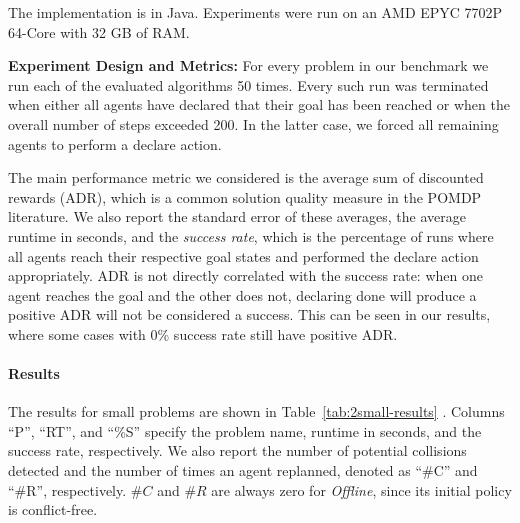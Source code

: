 \documentclass[letterpaper]{article} %
\begin{document}
The implementation is in Java. Experiments were run on an AMD\textsc{\textregistered} EPYC 7702P 64-Core with 32 GB of RAM.



\noindent\textbf{Experiment Design and Metrics:}
For every problem in our benchmark we run each of the evaluated algorithms 50 times. 
Every such run was terminated when either all agents have declared that their goal has been reached or when the overall number of steps exceeded 200. In the latter case, we forced all remaining agents to perform a declare action. 


The main performance metric we considered is the average sum of discounted rewards (ADR), which is a common solution quality measure in the POMDP literature. 
We also report the standard error of these averages, the average runtime in seconds, 
and the \emph{success rate}, which is the percentage of runs where all agents reach their respective goal states and performed the declare action appropriately. 
ADR is not directly correlated with the success rate: when one agent reaches the goal and the other does not, declaring done will produce a positive ADR will not be considered a success. This can be seen in our results, where some cases with 0\% success rate still have positive ADR. 

 





\paragraph{Results} 

The results for small problems are shown in Table~\ref{tab:2small-results} . 
Columns ``P'', ``RT'', and ``\%S'' specify the problem name, runtime in seconds, and the success rate, respectively. 
We also report the number of potential collisions detected and the number of times an agent replanned, denoted as ``\#C'' and ``\#R'', respectively. 
$\#C$ and $\#R$ are always zero for \emph{Offline}, since its initial policy is conflict-free. %
\end{document}
